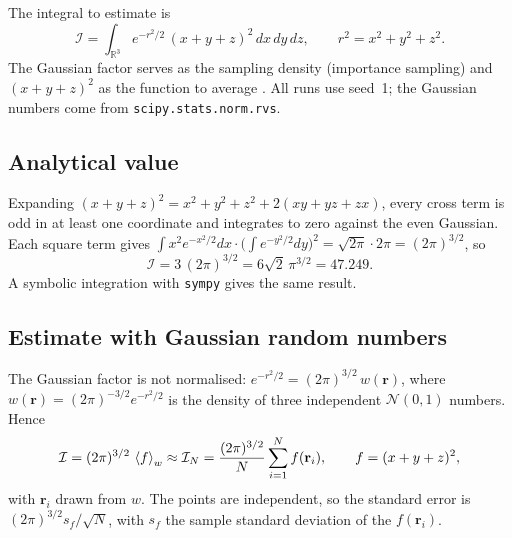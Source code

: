 
The integral to estimate is
\begin{equation}
  \mathcal I = \int_{\mathbb R^3} e^{-r^2/2}\,(x+y+z)^2\,dx\,dy\,dz, \qquad r^2 = x^2+y^2+z^2 .
\end{equation}
The Gaussian factor serves as the sampling density (importance sampling) and $(x+y+z)^2$ as the
function to average \cite{Carlon2025}. All runs use seed~1; the Gaussian numbers come from
\texttt{scipy.stats.norm.rvs}.

\subsection{Analytical value}

Expanding $(x+y+z)^2 = x^2+y^2+z^2 + 2(xy+yz+zx)$, every cross term is odd in at least one
coordinate and integrates to zero against the even Gaussian. Each square term gives
$\int x^2 e^{-x^2/2}dx \cdot \big(\int e^{-y^2/2}dy\big)^2 = \sqrt{2\pi}\cdot 2\pi = (2\pi)^{3/2}$, so
\begin{equation}
  \mathcal I = 3\,(2\pi)^{3/2} = 6\sqrt2\,\pi^{3/2} = 47.249 .
\end{equation}
A symbolic integration with \texttt{sympy} gives the same result.

\subsection{Estimate with Gaussian random numbers}

The Gaussian factor is not normalised: $e^{-r^2/2} = (2\pi)^{3/2}\,w(\mathbf r)$, where
$w(\mathbf r) = (2\pi)^{-3/2}e^{-r^2/2}$ is the density of three independent $\mathcal N(0,1)$ numbers.
Hence
\begin{equation}
  \mathcal I = (2\pi)^{3/2}\,\left\langle f \right\rangle_w \approx \mathcal I_N = \frac{(2\pi)^{3/2}}{N}\sum_{i=1}^{N} f(\mathbf r_i),
  \qquad f = (x+y+z)^2 ,
\end{equation}
with $\mathbf r_i$ drawn from $w$. The points are independent, so the standard error is
$(2\pi)^{3/2}s_f/\sqrt N$, with $s_f$ the sample standard deviation of the $f(\mathbf r_i)$.


